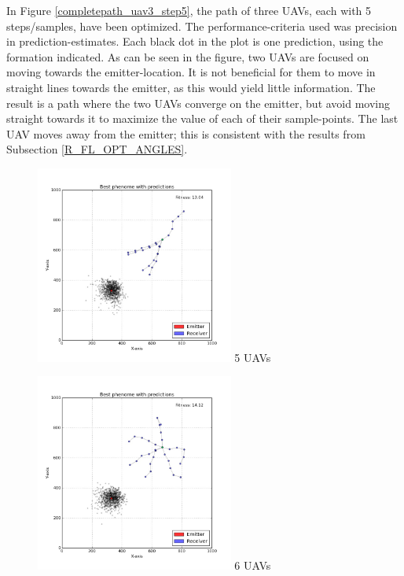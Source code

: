 \documentclass[10pt,a4paper]{book}
\begin{document}
In Figure \ref{completepath_uav3_step5}, the path of three \glspl{UAV}, each with 5 steps/samples, have been optimized. The performance-criteria used was precision in prediction-estimates. Each black dot in the plot is one prediction, using the formation indicated. As can be seen in the figure, two \glspl{UAV} are focused on moving towards the emitter-location. It is not beneficial for them to move in straight lines towards the emitter, as this would yield little information. The result is a path where the two  \glspl{UAV} converge on the emitter, but avoid moving straight towards it to maximize the value of each of their sample-points. The last \gls{UAV} moves away from the emitter; this is consistent with the results from Subsection \ref{R_FL_OPT_ANGLES}.



\begin{figure}[H]
\centering
\begin{minipage}{60mm}
  \centering
\includegraphics[width=65mm]{uav4steps5.jpg}
  5 \glspl{UAV}
\end{minipage}%
\begin{minipage}{60mm}
  \centering
\includegraphics[width=65mm]{uav5steps5.jpg}
  6 \glspl{UAV}
\end{minipage}
\begin{minipage}{60mm}

\end{minipage}
\end{figure}
\end{document}
